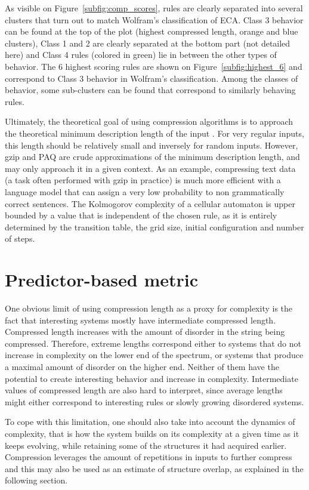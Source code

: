 As visible on Figure~\ref{subfig:comp_scores}, rules are clearly separated into
several clusters that turn out to match Wolfram’s classification of ECA. Class 3
behavior can be found at the top of the plot (highest compressed length, orange
and blue clusters), Class 1 and 2 are clearly separated at the bottom part (not
detailed here) and Class 4 rules (colored in green) lie in between the other
types of behavior. The 6 highest scoring rules are shown on
Figure~\ref{subfig:highest_6} and correspond to Class 3 behavior in Wolfram's
classification. Among the classes of behavior, some sub-clusters can be found
that correspond to similarly behaving rules.

Ultimately, the theoretical goal of using compression algorithms is to approach
the theoretical minimum description length of the input
\parencite{grunwald_minimum_2007}. For very regular inputs, this length should be
relatively small and inversely for random inputs. However, gzip and PAQ are
crude approximations of the minimum description length, and may only approach it
in a given context. As an example, compressing text data (a task often performed
with gzip in practice) is much more efficient with a language model that can
assign a very low probability to non grammatically correct sentences. The
Kolmogorov complexity \parencite{kolmogorov_three_1968} of a cellular automaton is
upper bounded by a value that is independent of the chosen rule, as it is
entirely determined by the transition table, the grid size, initial
configuration and number of steps.

\section{Predictor-based metric}

One obvious limit of using compression length as a proxy for complexity is the
fact that interesting systems mostly have intermediate compressed length.
Compressed length increases with the amount of disorder in the string being
compressed. Therefore, extreme lengths correspond either to systems that do not
increase in complexity on the lower end of the spectrum, or systems that produce
a maximal amount of disorder on the higher end. Neither of them have the
potential to create interesting behavior and increase in complexity.
Intermediate values of compressed length are also hard to interpret, since
average lengths might either correspond to interesting rules or slowly growing
disordered systems.

To cope with this limitation, one should also take into account the dynamics of
complexity, that is how the system builds on its complexity at a given time as
it keeps evolving, while retaining some of the structures it had acquired
earlier. Compression leverages the amount of repetitions in inputs to further
compress and this may also be used as an estimate of structure overlap, as
explained in the following section.

